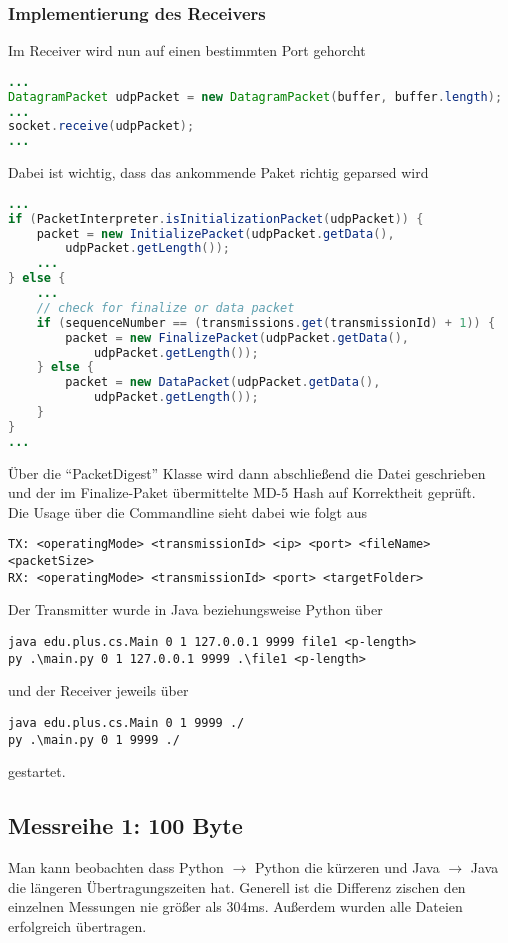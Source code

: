 \documentclass{article}
\begin{document}
    \subsubsection*{Implementierung des Receivers}
    Im Receiver wird nun auf einen bestimmten Port gehorcht

    \begin{lstlisting}[language=Java]
...
DatagramPacket udpPacket = new DatagramPacket(buffer, buffer.length);
...
socket.receive(udpPacket);
...
    \end{lstlisting}

    Dabei ist wichtig, dass das ankommende Paket richtig geparsed wird

    \begin{lstlisting}[language=Java]
...
if (PacketInterpreter.isInitializationPacket(udpPacket)) {
    packet = new InitializePacket(udpPacket.getData(),
        udpPacket.getLength());
    ...
} else {
    ...
    // check for finalize or data packet
    if (sequenceNumber == (transmissions.get(transmissionId) + 1)) {
        packet = new FinalizePacket(udpPacket.getData(),
            udpPacket.getLength());
    } else {
        packet = new DataPacket(udpPacket.getData(),
            udpPacket.getLength());
    }
}
...
    \end{lstlisting}

    Über die \enquote{PacketDigest} Klasse wird dann abschließend die Datei geschrieben und der im Finalize-Paket
    übermittelte MD-5 Hash auf Korrektheit geprüft.\\

    Die Usage über die Commandline sieht dabei wie folgt aus
    \begin{lstlisting}
TX: <operatingMode> <transmissionId> <ip> <port> <fileName>
<packetSize>
RX: <operatingMode> <transmissionId> <port> <targetFolder>
    \end{lstlisting}

    Der Transmitter wurde in Java beziehungsweise Python über
    \begin{lstlisting}
java edu.plus.cs.Main 0 1 127.0.0.1 9999 file1 <p-length>
py .\main.py 0 1 127.0.0.1 9999 .\file1 <p-length>
    \end{lstlisting}und der Receiver jeweils über
    \begin{lstlisting}
java edu.plus.cs.Main 0 1 9999 ./
py .\main.py 0 1 9999 ./
    \end{lstlisting}
    gestartet.

    \subsection{Messreihe 1: 100 Byte}\label{subsec:messreihe-1:-100-byte}
    Man kann beobachten dass Python $\rightarrow$ Python die kürzeren und Java $\rightarrow$ Java die längeren Übertragungszeiten hat.
    Generell ist die Differenz zischen den einzelnen Messungen nie größer als 304ms.
    Außerdem wurden alle Dateien erfolgreich übertragen.
\end{document}
